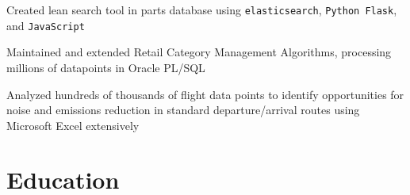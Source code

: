\documentclass[]{deedy-resume-openfont}
\begin{document}





\begin{tightemize} %
\item Created lean search tool in parts database using \verb|elasticsearch|, \verb|Python Flask|, and \verb|JavaScript|
\end{tightemize} %
\sectionsep



\begin{tightemize} %
\item Maintained and extended Retail Category Management Algorithms, processing millions of datapoints in Oracle PL/SQL
\end{tightemize} %
\sectionsep




\begin{tightemize} %
\item Analyzed hundreds of thousands of flight data points to identify opportunities for noise and emissions reduction in standard departure/arrival routes using Microsoft Excel extensively
\end{tightemize} %






\section{Education}
\sectionsep

\sectionsep
\end{document}
